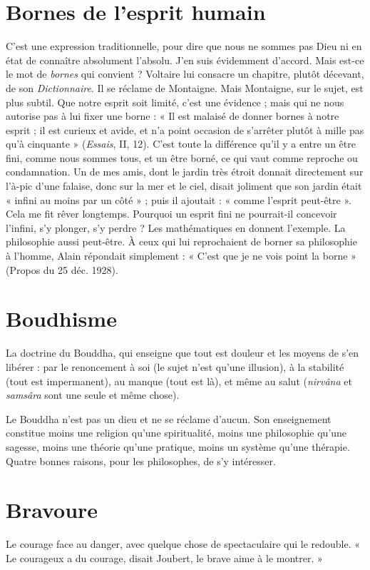 \section{Bornes de l'esprit humain}
C'est une expression traditionnelle,
pour dire que nous ne sommes pas
Dieu ni en état de connaître absolument l'absolu. J’en suis évidemment
d’accord. Mais est-ce le mot de {\it bornes} qui convient ? Voltaire lui consacre un
chapitre, plutôt décevant, de son {\it Dictionnaire}. Il se réclame de Montaigne.
Mais Montaigne, sur le sujet, est plus subtil. Que notre esprit soit limité, c’est
une évidence ; mais qui ne nous autorise pas à lui fixer une borne : « Il est
malaisé de donner bornes à notre esprit ; il est curieux et avide, et n’a point
occasion de s’arrêter plutôt à mille pas qu’à cinquante » ({\it Essais}, II, 12). C’est
toute la différence qu’il y a entre un être fini, comme nous sommes tous, et un
être borné, ce qui vaut comme reproche ou condamnation. Un de mes amis,
dont le jardin très étroit donnait directement sur l’à-pic d’une falaise, donc sur
la mer et le ciel, disait joliment que son jardin était « infini au moins par un
côté » ; puis il ajoutait : « comme l'esprit peut-être ». Cela me fit rêver longtemps.
Pourquoi un esprit fini ne pourrait-il concevoir l'infini, s’y plonger, s’y
perdre ? Les mathématiques en donnent l’exemple. La philosophie aussi peut-être.
À ceux qui lui reprochaient de borner sa philosophie à l’homme, Alain
répondait simplement : « C’est que je ne vois point la borne » (Propos du
25 déc. 1928).

\section{Boudhisme}
La doctrine du Bouddha, qui enseigne que tout est douleur
et les moyens de s’en libérer : par le renoncement à soi (le
sujet n’est qu’une illusion), à la stabilité (tout est impermanent), au manque
(tout est là), et même au salut ({\it nirvâna} et {\it samsâra} sont une seule et même
chose).

Le Bouddha n’est pas un dieu et ne se réclame d’aucun. Son enseignement
constitue moins une religion qu’une spiritualité, moins une philosophie qu’une
sagesse, moins une théorie qu’une pratique, moins un système qu’une thérapie.
Quatre bonnes raisons, pour les philosophes, de s’y intéresser.

\section{Bravoure}
Le courage face au danger, avec quelque chose de spectaculaire
qui le redouble. « Le courageux a du courage, disait Joubert, le
brave aime à le montrer. »

